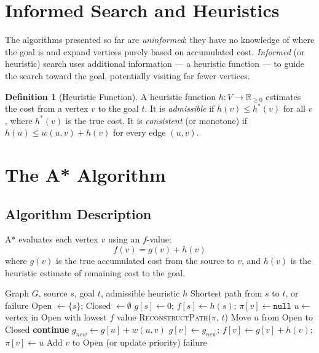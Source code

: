 \documentclass[12pt, a4paper, oneside]{report}
\theoremstyle{definition}
\newtheorem{definition}{Definition}[chapter]
\begin{document}
\section{Informed Search and Heuristics}

The algorithms presented so far are \emph{uninformed}: they have no knowledge of where the goal is and expand vertices purely based on accumulated cost. \emph{Informed} (or heuristic) search uses additional information — a heuristic function — to guide the search toward the goal, potentially visiting far fewer vertices.

\begin{definition}[Heuristic Function]
A heuristic function $h: V \to \mathbb{R}_{\geq 0}$ estimates the cost from a vertex $v$ to the goal $t$. It is \emph{admissible} if $h(v) \leq h^*(v)$ for all $v$, where $h^*(v)$ is the true cost. It is \emph{consistent} (or monotone) if $h(u) \leq w(u,v) + h(v)$ for every edge $(u,v)$.
\end{definition}

\section{The A* Algorithm}

\subsection{Algorithm Description}

A* \citep{hart1968} evaluates each vertex $v$ using an $f$-value:
\[
f(v) = g(v) + h(v)
\]
where $g(v)$ is the true accumulated cost from the source to $v$, and $h(v)$ is the heuristic estimate of remaining cost to the goal.

\begin{algorithm}[H]
\caption{A* Search}
\label{alg:astar}
\begin{algorithmic}[1]
\Require Graph $G$, source $s$, goal $t$, admissible heuristic $h$
\Ensure Shortest path from $s$ to $t$, or failure
\State Open $\gets \{s\}$; Closed $\gets \emptyset$
\State $g[s] \gets 0$; $f[s] \gets h(s)$; $\pi[v] \gets \texttt{null}$
    \State $u \gets$ vertex in Open with lowest $f$ value
        \State \Return \textsc{ReconstructPath}($\pi$, $t$)
    \EndIf
    \State Move $u$ from Open to Closed
            \State \textbf{continue}
        \EndIf
        \State $g_{new} \gets g[u] + w(u,v)$
            \State $g[v] \gets g_{new}$; $f[v] \gets g[v] + h(v)$; $\pi[v] \gets u$
            \State Add $v$ to Open (or update priority)
        \EndIf
    \EndFor
\EndWhile
\State \Return failure
\end{algorithmic}
\end{algorithm}
\end{document}
